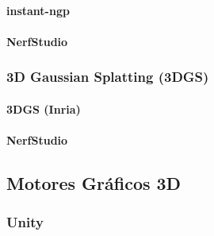 \documentclass[a4paper, 12pt, spanish, twoside]{article}
\begin{document}
\paragraph{instant-ngp} \label{sec:herramientas:radfi:nerf:instant-ngp}

\paragraph{NerfStudio} \label{sec:herramientas:radfi:nerf:nerfstudio}


\subsubsection{3D Gaussian Splatting (3DGS)} \label{sec:herramientas:radfi:3dgs}

\paragraph{3DGS (Inria)} \label{sec:herramientas:radfi:3dgs:inria}

\paragraph{NerfStudio} \label{sec:herramientas:radfi:3dgs:nerfstudio}



\subsection{Motores Gráficos 3D} \label{sec:herramientas:motoresgraficos3d}

\subsubsection{Unity} \label{sec:herramientas:motoresgraficos3d:unity}


\end{document}
